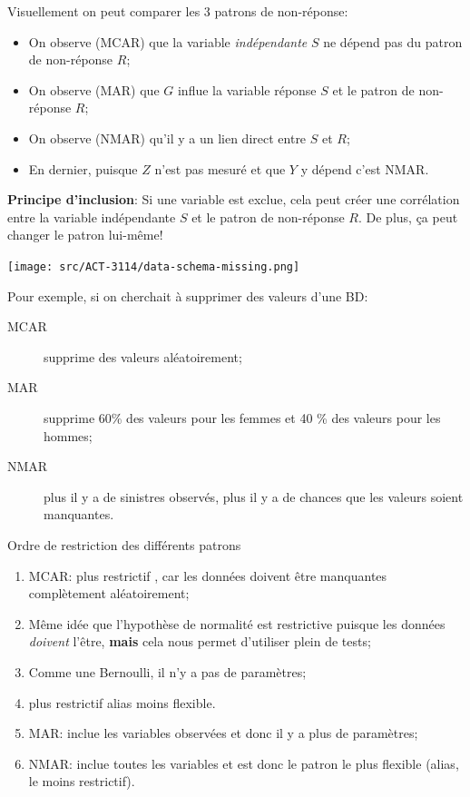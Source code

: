 \documentclass[10pt, french]{article}
\begin{document}
\begin{multicols*}{3}
Visuellement on peut comparer les 3 patrons de non-réponse:
\begin{itemize}[leftmargin = *]
	\item	On observe (MCAR) que la variable \textit{indépendante} $S$ ne dépend pas du patron de non-réponse $R$;
	\item	On observe (MAR) que $G$ influe la variable réponse $S$ et le patron de non-réponse $R$;
	\item	On observe (NMAR) qu'il y a un lien direct entre $S$ et $R$;
	\item	En dernier, puisque $Z$ n'est pas mesuré et que $Y$ y dépend c'est NMAR.
\end{itemize}
\textbf{Principe d'inclusion}: Si une variable est exclue, cela peut créer une corrélation entre la variable indépendante $S$ et le patron de non-réponse $R$. De plus, ça peut changer le patron lui-même!

\texttt{[image: src/ACT-3114/data-schema-missing.png]}

Pour exemple, si on cherchait à supprimer des valeurs d'une BD:
\begin{description}
	\item[MCAR]	supprime des valeurs aléatoirement;
	\item[MAR]	supprime 60\% des valeurs pour les femmes et 40 \% des valeurs pour les hommes;
	\item[NMAR]	plus il y a de sinistres observés, plus il y a de chances que les valeurs soient manquantes.
\end{description}

Ordre de restriction des différents patrons
\begin{enumerate}[leftmargin = *]
	\item	MCAR: plus \og restrictif \fg{}, car les données doivent être manquantes complètement aléatoirement;
	\item[]	Même idée que l'hypothèse de normalité est restrictive puisque les données \textit{doivent} l'être, \textbf{mais} cela nous permet d'utiliser plein de tests;
	\item[]	Comme une Bernoulli, il n'y a pas de paramètres;
	\item[]	plus restrictif alias moins flexible.
	\item	MAR: inclue les variables observées et donc il y a plus de paramètres;
	\item	NMAR: inclue toutes les variables et est donc le patron le plus flexible (alias, le moins restrictif).
\end{enumerate}


\end{multicols*}
\end{document}
